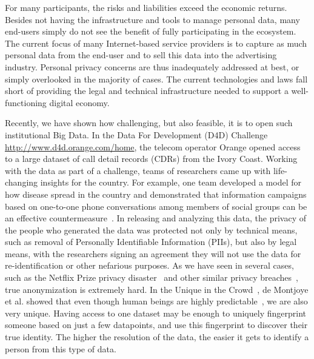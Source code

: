 For many participants, the risks and liabilities exceed the economic returns.
Besides not having the infrastructure and tools to manage personal data, many end-users simply do not see the benefit of fully participating in the ecosystem.
The current focus of many Internet-based service providers is to capture as much personal data from the end-user and to sell this data into the advertising industry.
Personal privacy concerns are thus inadequately addressed at best, or simply overlooked in the majority of cases.
The current technologies and laws fall short of providing the legal and technical infrastructure needed to support a well-functioning digital economy.

Recently, we have shown how challenging, but also feasible, it is to open such institutional Big Data.
In the Data For Development (D4D) Challenge \url{http://www.d4d.orange.com/home}, the telecom operator Orange opened access to a large dataset of call detail records (CDRs) from the Ivory Coast.
Working with the data as part of a challenge, teams of researchers came up with life-changing insights for the country. For example, one team developed a model for how disease spread in the country and demonstrated that information campaigns based on one-to-one phone conversations among members of social groups can be an effective countermeasure~\cite{lima2013exploiting}. 
In releasing and analyzing this data, the privacy of the people who generated the data was protected not only by technical means, such as removal of Personally Identifiable Information (PIIs), but also by legal means, with the researchers signing an agreement they will not use the data for re-identification or other nefarious purposes.
As we have seen in several cases, such as the Netflix Prize privacy disaster~\cite{narayanan2008robust} and other similar privacy breaches~\cite{sweeney2000simple}, true anonymization is extremely hard.
In the Unique in the Crowd~\cite{de2013unique}, de Montjoye et al. showed that even though human beings are highly predictable~\cite{song2010limits}, we are also very unique.
Having access to one dataset may be enough to uniquely fingerprint someone based on just a few datapoints, and use this fingerprint to discover their true identity.
The higher the resolution of the data, the easier it gets to identify a person from this type of data.


